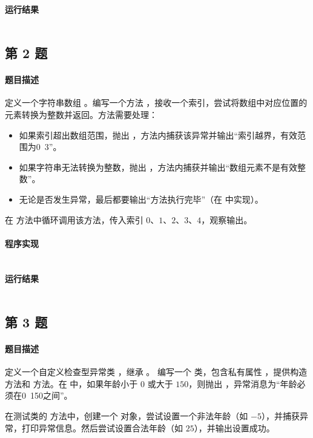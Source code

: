 \documentclass{academics}
\begin{document}
\paragraph{运行结果} {
    \inputminted{text}{../res/P01.out}
}

\subsection{第 2 题}

\paragraph{题目描述} {
    定义一个字符串数组 。编写一个方法 ，接收一个索引，尝试将数组中对应位置的元素转换为整数并返回。方法需要处理：

    \begin{itemize}
        \item 如果索引超出数组范围，抛出 ，方法内捕获该异常并输出``索引越界，有效范围为0~3''。
        \item 如果字符串无法转换为整数，抛出 ，方法内捕获并输出``数组元素不是有效整数''。
        \item 无论是否发生异常，最后都要输出``方法执行完毕''（在  中实现）。
    \end{itemize}
    在  方法中循环调用该方法，传入索引 $0$、$1$、$2$、$3$、$4$，观察输出。
}

\paragraph{程序实现} {
    \inputminted[label=ArrayConverter.java]{java}{../src/P02/ArrayConverter.java}
}

\paragraph{运行结果} {
    \inputminted{text}{../res/P02.out}
}

\subsection{第 3 题}

\paragraph{题目描述} {
    定义一个自定义检查型异常类 ，继承 。
    编写一个  类，包含私有属性 ，提供构造方法和  方法。在  中，如果年龄小于 $0$ 或大于 $150$，则抛出 ，异常消息为``年龄必须在0~150之间''。

    在测试类的  方法中，创建一个  对象，尝试设置一个非法年龄（如 $-5$），并捕获异常，打印异常信息。然后尝试设置合法年龄（如 $25$），并输出设置成功。
}
\end{document}
